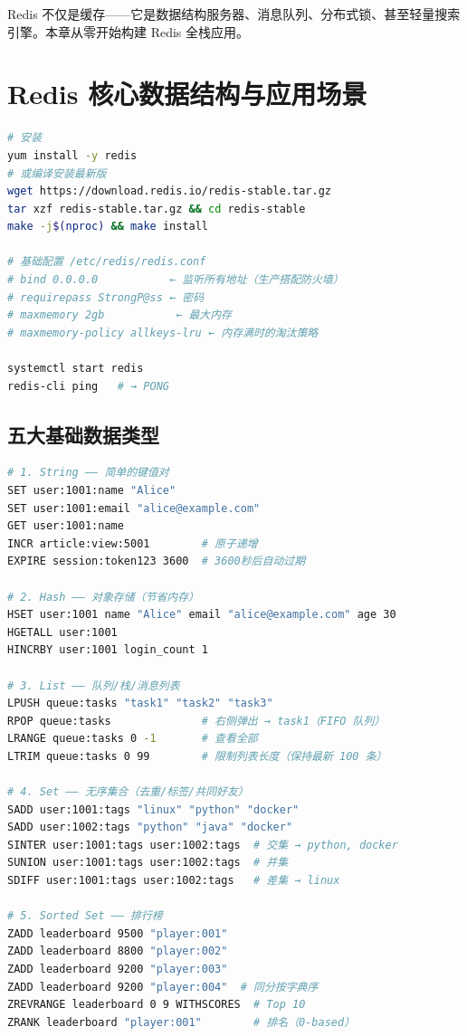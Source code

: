 \documentclass[12pt,UTF8]{ctexbook}
\begin{document}
Redis 不仅是缓存——它是数据结构服务器、消息队列、分布式锁、甚至轻量搜索引擎。本章从零开始构建 Redis 全栈应用。

\section{Redis 核心数据结构与应用场景}

\begin{lstlisting}[language=bash]
# 安装
yum install -y redis
# 或编译安装最新版
wget https://download.redis.io/redis-stable.tar.gz
tar xzf redis-stable.tar.gz && cd redis-stable
make -j$(nproc) && make install

# 基础配置 /etc/redis/redis.conf
# bind 0.0.0.0           ← 监听所有地址（生产搭配防火墙）
# requirepass StrongP@ss ← 密码
# maxmemory 2gb           ← 最大内存
# maxmemory-policy allkeys-lru ← 内存满时的淘汰策略

systemctl start redis
redis-cli ping   # → PONG
\end{lstlisting}

\subsection{五大基础数据类型}

\begin{lstlisting}[language=bash]
# 1. String —— 简单的键值对
SET user:1001:name "Alice"
SET user:1001:email "alice@example.com"
GET user:1001:name
INCR article:view:5001        # 原子递增
EXPIRE session:token123 3600  # 3600秒后自动过期

# 2. Hash —— 对象存储（节省内存）
HSET user:1001 name "Alice" email "alice@example.com" age 30
HGETALL user:1001
HINCRBY user:1001 login_count 1

# 3. List —— 队列/栈/消息列表
LPUSH queue:tasks "task1" "task2" "task3"
RPOP queue:tasks              # 右侧弹出 → task1（FIFO 队列）
LRANGE queue:tasks 0 -1       # 查看全部
LTRIM queue:tasks 0 99        # 限制列表长度（保持最新 100 条）

# 4. Set —— 无序集合（去重/标签/共同好友）
SADD user:1001:tags "linux" "python" "docker"
SADD user:1002:tags "python" "java" "docker"
SINTER user:1001:tags user:1002:tags  # 交集 → python, docker
SUNION user:1001:tags user:1002:tags  # 并集
SDIFF user:1001:tags user:1002:tags   # 差集 → linux

# 5. Sorted Set —— 排行榜
ZADD leaderboard 9500 "player:001"
ZADD leaderboard 8800 "player:002"
ZADD leaderboard 9200 "player:003"
ZADD leaderboard 9200 "player:004"  # 同分按字典序
ZREVRANGE leaderboard 0 9 WITHSCORES  # Top 10
ZRANK leaderboard "player:001"        # 排名（0-based）
\end{lstlisting}
\end{document}
